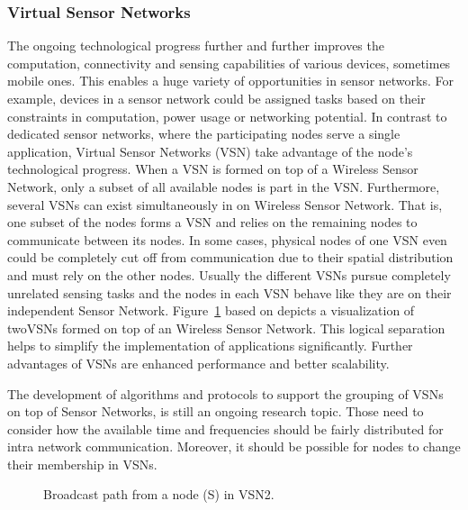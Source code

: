 \documentclass[journal]{IEEEtran}
\begin{document}
\subsubsection{Virtual Sensor Networks}
The ongoing technological progress further and further improves the computation, connectivity and sensing capabilities of various devices, sometimes mobile ones. \cite{Jayasumana} This enables a huge variety of opportunities in sensor networks. For example, devices in a sensor network could be assigned tasks based on their constraints in computation, power usage or networking potential. In contrast to dedicated sensor networks, where the participating nodes serve a single application, Virtual Sensor Networks (VSN) take advantage of the node’s technological progress. When a VSN is formed on top of a Wireless Sensor Network, only a subset of all available nodes is part in the VSN. Furthermore, several VSNs can exist simultaneously in on Wireless Sensor Network. \cite{Jayasumana} That is, one subset of the nodes forms a VSN and relies on the remaining nodes to communicate between its nodes. In some cases, physical nodes of one VSN even could be completely cut off from communication due to their spatial distribution and must rely on the other nodes. Usually the different VSNs pursue completely unrelated sensing tasks and the nodes in each VSN behave like they are on their independent Sensor Network. Figure~\ref{vsnfig} based on \cite{Jayasumana} depicts a visualization of twoVSNs formed on top of an Wireless Sensor Network. This logical separation helps to simplify the implementation of applications significantly. \cite{Jayasumana} Further advantages of VSNs are enhanced performance and better scalability.

The development of algorithms and protocols to support the grouping of VSNs on top of Sensor Networks, is still an ongoing research topic. Those need to consider how the available time and frequencies should be fairly distributed for intra network communication. Moreover, it should be possible for nodes to change their membership in VSNs.

\begin{figure}
 \centering
 \caption{Broadcast path from a node (S) in VSN2.}
 \label{vsnfig}
\end{figure}
\end{document}
